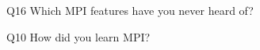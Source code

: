\begin{description}%
\item{Q16} Which MPI features have you never heard of?%
\item{Q10} How did you learn MPI?%
\end{description}%
